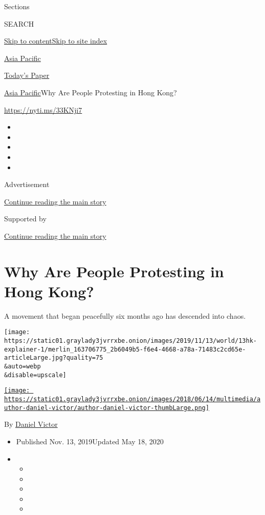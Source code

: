 Sections

SEARCH

\protect\hyperlink{site-content}{Skip to
content}\protect\hyperlink{site-index}{Skip to site index}

\href{https://www.nytimes3xbfgragh.onion/section/world/asia}{Asia
Pacific}

\href{https://myaccount.nytimes3xbfgragh.onion/auth/login?response_type=cookie\&client_id=vi}{}

\href{https://www.nytimes3xbfgragh.onion/section/todayspaper}{Today's
Paper}

\href{/section/world/asia}{Asia Pacific}\textbar{}Why Are People
Protesting in Hong Kong?

\url{https://nyti.ms/33KNji7}

\begin{itemize}
\item
\item
\item
\item
\item
\end{itemize}

Advertisement

\protect\hyperlink{after-top}{Continue reading the main story}

Supported by

\protect\hyperlink{after-sponsor}{Continue reading the main story}

\hypertarget{why-are-people-protesting-in-hong-kong}{%
\section{Why Are People Protesting in Hong
Kong?}\label{why-are-people-protesting-in-hong-kong}}

A movement that began peacefully six months ago has descended into
chaos.

\texttt{[image: https://static01.graylady3jvrrxbe.onion/images/2019/11/13/world/13hk-explainer-1/merlin\_163706775\_2b6049b5-f6e4-4668-a78a-71483c2cd65e-articleLarge.jpg?quality=75\\\&auto=webp\\\&disable=upscale]}

\href{https://www.nytimes3xbfgragh.onion/by/daniel-victor}{\texttt{[image: https://static01.graylady3jvrrxbe.onion/images/2018/06/14/multimedia/author-daniel-victor/author-daniel-victor-thumbLarge.png]}}

By \href{https://www.nytimes3xbfgragh.onion/by/daniel-victor}{Daniel
Victor}

\begin{itemize}
\item
  Published Nov. 13, 2019Updated May 18, 2020
\item
  \begin{itemize}
  \item
  \item
  \item
  \item
  \item
  \end{itemize}
\end{itemize}


